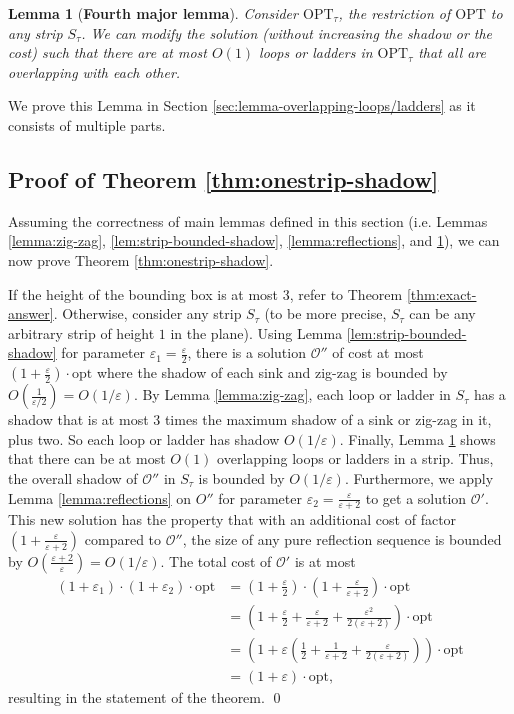 \documentclass[pdflatex,sn-mathphys-num]{sn-jnl}
\theoremstyle{thmstyleone}
\newtheorem{lemma}{Lemma}
\newcommand{\eps}{\varepsilon}
\newcommand{\opt}{{\text{opt}}}
\newcommand{\OPT}{{\text{OPT}}}
\begin{document}
\begin{lemma}[\bf Fourth major lemma]\label{lemma:overlapping-loops-ladders}
    Consider $\OPT_\tau$, the restriction of $\OPT$ to any strip $S_\tau$. We can modify the solution (without increasing the shadow or the cost) such that
    there are at most $O(1)$ loops or ladders in $ \OPT_\tau $ that all are overlapping with each other. 
\end{lemma}
We prove this Lemma in Section \ref{sec:lemma-overlapping-loops/ladders} as it consists of multiple parts.


\subsection{Proof of Theorem \ref{thm:onestrip-shadow}}
\label{sec:thm-onestrip-shadow}
Assuming the correctness of main lemmas defined in this section (i.e. Lemmas \ref{lemma:zig-zag}, \ref{lem:strip-bounded-shadow}, \ref{lemma:reflections}, and \ref{lemma:overlapping-loops-ladders}), we can now prove Theorem \ref{thm:onestrip-shadow}.

If the height of the bounding box is at most 3, refer to Theorem \ref{thm:exact-answer}.
Otherwise, consider any strip $S_\tau$ (to be more precise, $S_\tau$ can be any arbitrary strip of height $1$ in the plane).
Using Lemma \ref{lem:strip-bounded-shadow} for parameter $ \eps_1 = \frac\eps2 $, there is a solution $\mathcal O''$ of cost at most $(1+\frac\eps2)\cdot\opt$
where the shadow of each sink and zig-zag is bounded by $O(\frac1{\eps/2}) = O(1/\eps)$.
By Lemma \ref{lemma:zig-zag}, each loop or ladder in $S_\tau$ has a shadow that is at most 3 times the maximum  shadow of a sink or zig-zag in it, plus two. So each loop or ladder has shadow $O(1/\eps)$.
Finally, Lemma \ref{lemma:overlapping-loops-ladders} shows that there can be at most $O(1)$ overlapping loops or
ladders in a strip. Thus, the overall shadow of $\mathcal O''$ in $S_\tau$ is bounded by $O(1/\eps)$.
Furthermore, we apply Lemma \ref{lemma:reflections} on $ O'' $ for parameter $ \eps_2 = \frac\eps{\eps + 2} $ to get a solution $ \mathcal O' $. This new solution has the property that with an additional cost of factor $ (1 + \frac\eps{\eps+ 2}) $ compared to $ \mathcal O'' $, the size of any pure
reflection sequence is bounded by $O(\frac{\eps + 2}{\eps}) = O(1/\eps)$. The total cost of $ \mathcal O' $ is at most 
\begin{align*}
    (1 + \eps_1)\cdot (1+\eps_2)\cdot \opt &= (1 + \tfrac\eps2) \cdot (1 + \tfrac\eps{\eps + 2})\cdot \opt\\
    &= (1 + \tfrac\eps2 + \tfrac\eps{\eps + 2} + \tfrac{\eps^2}{2(\eps + 2)})\cdot\opt\\
    &= (1 + \eps (\tfrac12 + \tfrac1{\eps + 2} + \tfrac\eps{2(\eps + 2)}))\cdot \opt\\
    &= (1 + \eps)\cdot \opt,
\end{align*}
resulting in the statement of the theorem. \qed
\end{document}
